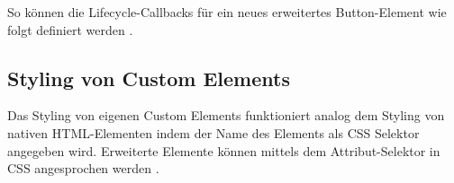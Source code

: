 So können die Lifecycle-Callbacks für ein neues erweitertes Button-Element  wie folgt definiert werden \cite{citeulike:13844988}.

\begin{Shaded}
\begin{Highlighting}[]
 \OperatorTok{=} \NormalTok{(}\NormalTok{)}\OperatorTok{;}

 \OperatorTok{=} \NormalTok{() }\OperatorTok{\{}\OperatorTok{\};}
 \OperatorTok{=} \NormalTok{() }\OperatorTok{\{}\OperatorTok{\};}

 \OperatorTok{=} \NormalTok{(}\OperatorTok{,} \OperatorTok{\{}
  \OperatorTok{:} 
\OperatorTok{\}}\NormalTok{)}\OperatorTok{;}
\end{Highlighting}
\end{Shaded}


\subsection{Styling von Custom Elements}\label{styling-von-custom-elements}

Das Styling von eigenen Custom Elements funktioniert analog dem Styling von nativen HTML-Elementen indem der Name des Elements als CSS Selektor angegeben wird. Erweiterte Elemente können mittels dem Attribut-Selektor in CSS angesprochen werden \cite{citeulike:13844975} .

\begin{Shaded}
\begin{Highlighting}[]
\KeywordTok{\{}
   \KeywordTok{;}
\KeywordTok{\}}

\CharTok{[is=}\CharTok{]} \KeywordTok{\{}
   \KeywordTok{;}
\KeywordTok{\}}
\end{Highlighting}
\end{Shaded}


